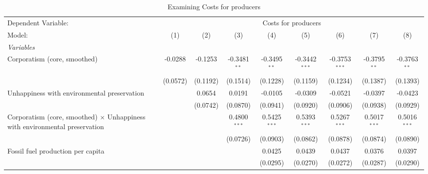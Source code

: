 
\begin{table}[htbp]
   \caption{Examining Costs for producers}
   \centering
   \begin{tabular}{lcccccccc}
      \tabularnewline \midrule \midrule
      Dependent Variable: & \multicolumn{8}{c}{Costs for producers}\\
      Model:                                                                             & (1)      & (2)      & (3)            & (4)            & (5)             & (6)             & (7)            & (8)\\  
      \midrule
      \emph{Variables}\\
      Corporatism (core, smoothed)                                                       & -0.0288  & -0.1253  & -0.3481$^{**}$ & -0.3495$^{**}$ & -0.3442$^{***}$ & -0.3753$^{***}$ & -0.3795$^{**}$ & -0.3763$^{**}$\\   
                                                                                         & (0.0572) & (0.1192) & (0.1514)       & (0.1228)       & (0.1159)        & (0.1234)        & (0.1387)       & (0.1393)\\   
      Unhappiness with environmental preservation                                        &          & 0.0654   & 0.0191         & -0.0105        & -0.0309         & -0.0521         & -0.0397        & -0.0423\\   
                                                                                         &          & (0.0742) & (0.0870)       & (0.0941)       & (0.0920)        & (0.0906)        & (0.0938)       & (0.0929)\\   
      Corporatism (core, smoothed) $\times$ Unhappiness with environmental preservation  &          &          & 0.4800$^{***}$ & 0.5425$^{***}$ & 0.5393$^{***}$  & 0.5267$^{***}$  & 0.5017$^{***}$ & 0.5016$^{***}$\\   
                                                                                         &          &          & (0.0726)       & (0.0903)       & (0.0862)        & (0.0878)        & (0.0874)       & (0.0890)\\   
      Fossil fuel production per capita                                                  &          &          &                & 0.0425         & 0.0439          & 0.0437          & 0.0376         & 0.0397\\   
                                                                                         &          &          &                & (0.0295)       & (0.0270)        & (0.0272)        & (0.0287)       & (0.0290)\\   

\end{tabular}
\end{table}
